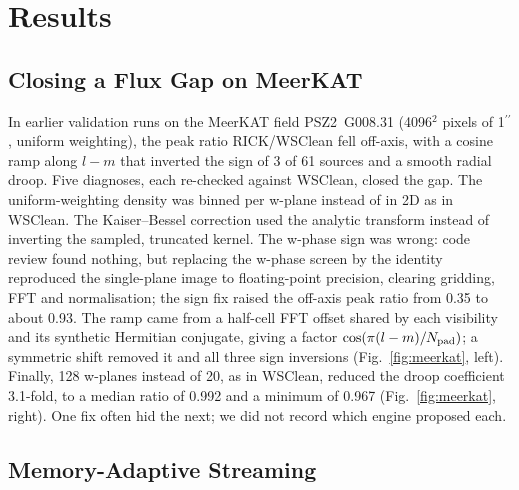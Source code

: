 \documentclass[11pt,twoside]{article}
\begin{document}
\section{Results}

\subsection{Closing a Flux Gap on MeerKAT}

In earlier validation runs on the MeerKAT field PSZ2~G008.31 (4096$^2$ pixels
of 1$^{\prime\prime}$, uniform weighting), the peak ratio RICK/WSClean fell
off-axis, with a cosine ramp along $l-m$ that inverted the sign of 3 of 61
sources and a smooth radial droop. Five diagnoses, each re-checked against
WSClean, closed the gap. The uniform-weighting density was binned per w-plane
instead of in 2D as in WSClean. The Kaiser--Bessel correction used the
analytic transform instead of inverting the sampled, truncated kernel. The
w-phase sign was wrong: code review found nothing, but replacing the w-phase
screen by the identity reproduced the single-plane image to floating-point
precision, clearing gridding, FFT and normalisation; the sign fix raised the
off-axis peak ratio from 0.35 to about 0.93. The ramp came from a half-cell
FFT offset shared by each visibility and its synthetic Hermitian conjugate,
giving a factor $\cos(\pi (l-m)/N_{\rm pad})$; a symmetric shift removed it
and all three sign inversions (Fig.~\ref{fig:meerkat}, left). Finally, 128
w-planes instead of 20, as in WSClean, reduced the droop coefficient 3.1-fold,
to a median ratio of 0.992 and a minimum of 0.967 (Fig.~\ref{fig:meerkat},
right). One fix often hid the next; we did not record which engine proposed
each.


\subsection{Memory-Adaptive Streaming}
\end{document}
